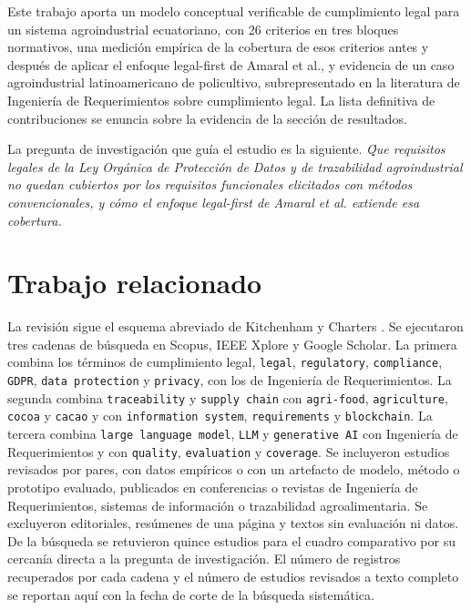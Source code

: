 \documentclass[pdflatex,sn-mathphys-num]{sn-jnl}
\begin{document}
Este trabajo aporta un modelo conceptual verificable de cumplimiento legal para un sistema agroindustrial ecuatoriano, con 26 criterios en tres bloques normativos, una medici\'on emp\'irica de la cobertura de esos criterios antes y despu\'es de aplicar el enfoque legal-first de Amaral et al., y evidencia de un caso agroindustrial latinoamericano de policultivo, subrepresentado en la literatura de Ingenier\'ia de Requerimientos sobre cumplimiento legal. La lista definitiva de contribuciones se enuncia sobre la evidencia de la secci\'on de resultados.

La pregunta de investigaci\'on que gu\'ia el estudio es la siguiente. \textit{\'Que requisitos legales de la Ley Org\'anica de Protecci\'on de Datos y de trazabilidad agroindustrial no quedan cubiertos por los requisitos funcionales elicitados con m\'etodos convencionales, y c\'omo el enfoque legal-first de Amaral et al. extiende esa cobertura.}

\section{Trabajo relacionado}\label{sec:trabajo-relacionado}

La revisi\'on sigue el esquema abreviado de Kitchenham y Charters \cite{kitchenham2007}. Se ejecutaron tres cadenas de b\'usqueda en Scopus, IEEE Xplore y Google Scholar. La primera combina los t\'erminos de cumplimiento legal, \texttt{legal}, \texttt{regulatory}, \texttt{compliance}, \texttt{GDPR}, \texttt{data protection} y \texttt{privacy}, con los de Ingenier\'ia de Requerimientos. La segunda combina \texttt{traceability} y \texttt{supply chain} con \texttt{agri-food}, \texttt{agriculture}, \texttt{cocoa} y \texttt{cacao} y con \texttt{information system}, \texttt{requirements} y \texttt{blockchain}. La tercera combina \texttt{large language model}, \texttt{LLM} y \texttt{generative AI} con Ingenier\'ia de Requerimientos y con \texttt{quality}, \texttt{evaluation} y \texttt{coverage}. Se incluyeron estudios revisados por pares, con datos emp\'iricos o con un artefacto de modelo, m\'etodo o prototipo evaluado, publicados en conferencias o revistas de Ingenier\'ia de Requerimientos, sistemas de informaci\'on o trazabilidad agroalimentaria. Se excluyeron editoriales, res\'umenes de una p\'agina y textos sin evaluaci\'on ni datos. De la b\'usqueda se retuvieron quince estudios para el cuadro comparativo por su cercan\'ia directa a la pregunta de investigaci\'on. El n\'umero de registros recuperados por cada cadena y el n\'umero de estudios revisados a texto completo se reportan aqu\'i con la fecha de corte de la b\'usqueda sistem\'atica.
\end{document}

